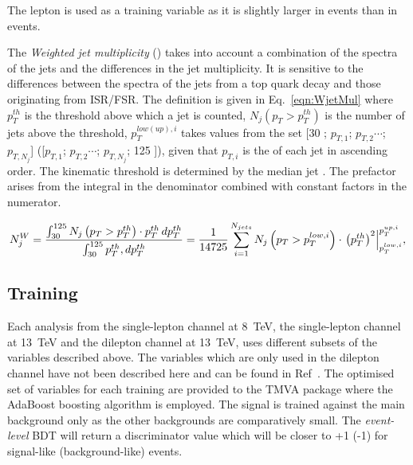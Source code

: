 The lepton \pt is used as a training variable as it is slightly larger in \tttt events than in \ttbar events.

The \emph{Weighted jet multiplicity} (\njetsw) takes into account a combination of the \pt spectra of the jets and the differences in the jet multiplicity. It is sensitive to the differences between the \pt spectra of the jets from a top quark decay and those originating from ISR/FSR. The \njetsw definition is given in Eq.~\ref{eqn:WjetMul} where $p_T^{th}$ is the \pt threshold above which a jet is counted, $N_j\left(p_T > p_T^{th}\right)$ is the number of jets above the \pt threshold, $p_T^{low(up),i}$ takes values from the set [30 \GeV; $p_{T,1}$; $p_{T,2}\cdots$; $p_{T,N_j}$] ([$p_{T,1}$; $p_{T,2}\cdots$; $p_{T,N_j}$; 125 \GeV]), given that $p_{T,i}$ is the \pt of each jet in ascending order. The kinematic threshold is determined by the median jet \pt. The prefactor arises from the integral in the denominator combined with constant factors in the numerator.

\begin{equation}
N_j^W = \frac{\int_{30}^{125}{N_j\left(p_T > p_T^{th}\right)\cdot p_T^{th}\,dp_T^{th}}} {\int_{30}^{125}{ p_T^{th}\\
,dp_T^{th}}} = \frac{1}{14725}\sum_{i=1}^{N_{jets}}{N_j\left(p_T>p_T^{low,i}\right)\cdot\left.\left(p_T^{th}\right)^2\right|^{p_T^{up,i}}_{p_T^{low,i}}},  
\label{eqn:WjetMul}
\end{equation} 


\subsection{Training}
Each analysis from the single-lepton channel at 8~TeV, the single-lepton channel at 13~TeV and the dilepton channel at 13~TeV, uses different subsets of the variables described above. The variables which are only used in the dilepton channel have not been described here and can be found in Ref~\cite{CMS-PAS-TOP-16-016}. The optimised set of variables for each training are provided to the TMVA package where the AdaBoost boosting algorithm is employed. The \tttt signal is trained against the main \ttbar background only as the other backgrounds are comparatively small. The \emph{event-level} BDT will return a discriminator value which will be closer to +1 (-1) for signal-like (background-like) events.

